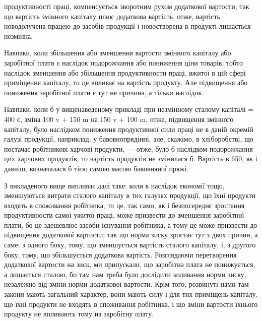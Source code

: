 \parcont{}  %
продуктивності праці, компенсується зворотним рухом додаткової вартости, так що
вартість змінного капіталу плюс додаткова вартість, отже, вартість новодолучена
працею до засобів продукції і новостворена в продукті лишається незмінна.

Навпаки, коли збільшення або зменшення вартости змінного капіталу або
заробітної плати є наслідок подорожчання або пониження ціни товарів, тобто
наслідок зменшення або збільшення продуктивности праці, вжитої в цій сфері
приміщення капіталу, то це впливає на вартість продукту. Але підвищення
або пониження заробітної плати є тут не причина, а тільки наслідок.

Навпаки, коли б у вищенаведеному прикладі при незмінному сталому
капіталі = 400 с, зміна 100 v + 150 m на 150 v + 100 m, отже, підвищення
змінного капіталу, було наслідком пониження продуктивної сили праці не в даній
окремій галузі продукції, наприклад, у бавовнопрядінні, але, скажімо, в хліборобстві,
що постачає робітникові харчові продукти, — отже, було б наслідком
подорожчання цих харчових продуктів, то вартість продуктів не змінилася б.
Вартість в 650, як і давніш, визначалася б тією самою масою бавовняної пряжі.

З викладеного вище випливає далі таке: коли в наслідок економії тощо,
зменшуються витрати сталого капіталу в тих галузях продукції, що їхні продукти
входять в споживання робітника, то це, так само, як і безпосереднє зростання
продуктивности самої ужитої праці, може призвести до зменшення заробітної
плати, бо це здешевлює засоби існування робітника, а тому це може
призвести до підвищення додаткової вартости; так що норма зиску зростає тут
з двох причин, а саме: з одного боку, тому, що зменшується вартість сталого
капіталу, і, з другого боку, тому, що збільшується додаткова вартість. Розглядаючи
перетворення додаткової вартости на зиск, ми припускали, що заробітна
плата не понижується, а лишається сталою, бо там нам треба було дослідити
коливання норми зиску, незалежно від зміни норми додаткової вартости. Крім
того, розвинуті нами там закони мають загальний характер, вони мають силу
і для тих приміщень капіталу, що їхні продукти не входять в споживання робітника,
і що зміни вартости їхнього продукту не впливають тому на заробітну плату.

